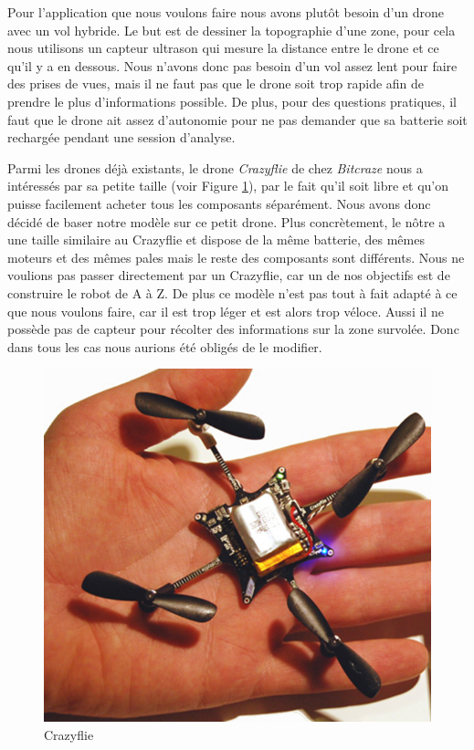 \documentclass[a4paper,10pt]{report}
\begin{document}
    Pour l'application que nous voulons faire nous avons plutôt besoin d'un 
drone avec un vol hybride. Le but est de dessiner la topographie d'une zone, 
pour cela nous utilisons un capteur ultrason qui mesure la distance entre le 
drone et ce qu'il y a en dessous. Nous n'avons donc pas besoin d'un vol assez 
lent pour faire des prises de vues, mais il ne faut pas que le drone soit trop 
rapide afin de prendre le plus d'informations possible. De plus, pour des 
questions pratiques, il faut que le drone ait assez d'autonomie pour ne pas 
demander que sa batterie soit rechargée pendant une session d'analyse.
    
    Parmi les drones déjà existants, le drone \textit{Crazyflie} de chez 
\textit{Bitcraze}\cite{bitcraze} nous a intéressés par sa petite taille (voir 
Figure \ref{crazyflie}), par le fait qu'il soit libre et qu'on puisse 
facilement 
acheter tous les composants séparément. Nous avons donc décidé de baser notre 
modèle sur ce petit drone. Plus concrètement, le nôtre a une taille similaire 
au Crazyflie et dispose de la même batterie, des mêmes moteurs et des mêmes 
pales mais le reste des composants sont différents. Nous ne voulions pas passer 
directement par un Crazyflie, car un de nos objectifs est de construire le 
robot 
de A à Z. De plus ce modèle n'est pas tout à fait adapté à ce que nous voulons 
faire, car il est trop léger et est alors trop véloce. Aussi il ne possède 
pas de capteur pour récolter des informations sur la zone survolée. Donc dans 
tous les cas nous aurions été obligés de le modifier.
    
    \begin{figure}[htbp]%
      \centering
      \includegraphics[scale = 0.25]{img/crazyflie.png}
      \caption{Crazyflie}
      \label{crazyflie}
    \end{figure}
    
\end{document}
